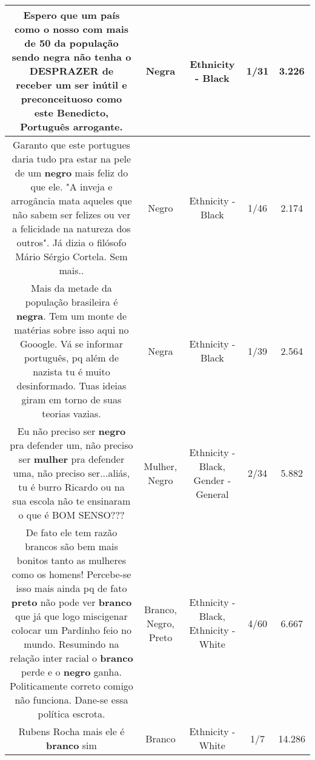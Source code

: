 \documentclass[11pt]{article}
\newlength\mylength
\begin{document}
\begin{center}
\begin{longtable}{|C{.65\mylength}|C{.30\mylength}|C{.12\mylength}|C{.12\mylength}|C{.12\mylength}|}
  \small Espero que um país como o nosso com mais de 50 da população sendo \textbf{negra} não tenha o DESPRAZER de receber um ser inútil e preconceituoso como este Benedicto, Português arrogante.\normalsize   & Negra & Ethnicity - Black & 1/31 & 3.226 \\  \hline
  \small Garanto que este portugues daria tudo pra estar na pele de um \textbf{negro} mais feliz do que ele. "A inveja e arrogância mata aqueles que não sabem ser felizes ou ver a felicidade na natureza dos outros". Já dizia o filósofo Mário Sérgio Cortela. Sem mais..\normalsize   & Negro & Ethnicity - Black & 1/46 & 2.174 \\  \hline
  \small Mais da metade da população brasileira é \textbf{negra}. Tem um monte de matérias sobre isso aqui no Gooogle. Vá se informar português, pq além de nazista tu é muito desinformado. Tuas ideias giram em torno de suas teorias vazias.\normalsize   & Negra & Ethnicity - Black & 1/39 & 2.564 \\  \hline
  \small Eu não preciso ser \textbf{negro} pra defender um, não preciso ser \textbf{mulher} pra defender uma, não preciso ser...aliás, tu é burro Ricardo ou na sua escola não te ensinaram o que é BOM SENSO???\normalsize   & Mulher, Negro & Ethnicity - Black, Gender - General & 2/34 & 5.882 \\  \hline
  \small De fato ele tem razão brancos são bem mais bonitos tanto as mulheres como os homens! Percebe-se isso mais ainda pq de fato \textbf{preto} não pode ver \textbf{branco} que já que logo miscigenar colocar um Pardinho feio no mundo. Resumindo na relação inter racial o \textbf{branco} perde e o \textbf{negro} ganha. Politicamente correto comigo não funciona. Dane-se essa política escrota.\normalsize   & Branco, Negro, Preto & Ethnicity - Black, Ethnicity - White & 4/60 & 6.667 \\  \hline
  \small Rubens Rocha mais ele é \textbf{branco} sim\normalsize   & Branco & Ethnicity - White & 1/7 & 14.286 \\  \hline

\end{longtable}
\end{center}
\end{document}
